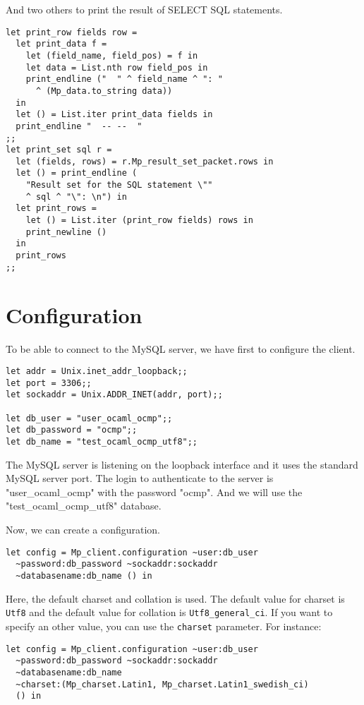 \documentclass[a4paper, english, 11pt]{article}
\begin{document}
And two others to print the result of SELECT SQL statements.

\begin{verbatim}
let print_row fields row = 
  let print_data f = 
    let (field_name, field_pos) = f in
    let data = List.nth row field_pos in
    print_endline ("  " ^ field_name ^ ": " 
      ^ (Mp_data.to_string data))
  in
  let () = List.iter print_data fields in
  print_endline "  -- --  "
;;
let print_set sql r = 
  let (fields, rows) = r.Mp_result_set_packet.rows in
  let () = print_endline (
    "Result set for the SQL statement \"" 
    ^ sql ^ "\": \n") in
  let print_rows =   
    let () = List.iter (print_row fields) rows in
    print_newline ()
  in
  print_rows
;;
\end{verbatim}

\section{Configuration}

To be able to connect to the MySQL server, we have first to configure the client.

\begin{verbatim}
let addr = Unix.inet_addr_loopback;;
let port = 3306;;
let sockaddr = Unix.ADDR_INET(addr, port);;

let db_user = "user_ocaml_ocmp";;
let db_password = "ocmp";;
let db_name = "test_ocaml_ocmp_utf8";;
\end{verbatim}

The MySQL server is listening on the loopback interface and it uses the standard MySQL server port. The login to authenticate to the server is "user\_ocaml\_ocmp" with the password "ocmp". And we will use the "test\_ocaml\_ocmp\_utf8" database.

Now, we can create a configuration.

\begin{verbatim}
let config = Mp_client.configuration ~user:db_user
  ~password:db_password ~sockaddr:sockaddr 
  ~databasename:db_name () in
\end{verbatim}

Here, the default charset and collation is used. The default value for charset is \texttt{Utf8} and the default value for collation is \texttt{Utf8\_general\_ci}. If you want to specify an other value, you can use the \texttt{charset} parameter. For instance:
\begin{verbatim}
let config = Mp_client.configuration ~user:db_user 
  ~password:db_password ~sockaddr:sockaddr 
  ~databasename:db_name 
  ~charset:(Mp_charset.Latin1, Mp_charset.Latin1_swedish_ci)
  () in
\end{verbatim}
\end{document}

